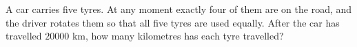 A car carries five tyres. At any moment exactly four of them are on the road, and the driver rotates them so that all five tyres are used equally. After the car has travelled $20000$ km, how many kilometres has each tyre travelled?
